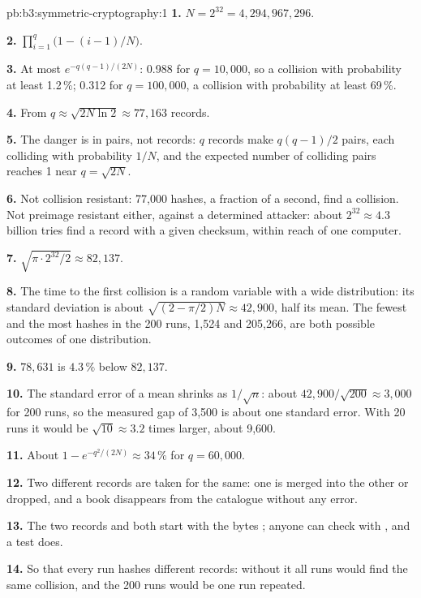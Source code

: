 \begin{solution}{pb:b3:symmetric-cryptography:1}
\textbf{1.} $N = 2^{32} = 4{,}294{,}967{,}296$.

\textbf{2.} $\prod_{i=1}^{q} \bigl(1 - (i - 1)/N\bigr)$.

\textbf{3.} At most $e^{-q(q-1)/(2N)}$: 0.988 for $q = 10{,}000$, so a collision with probability at least 1.2\,\%; 0.312 for $q = 100{,}000$, a collision with probability at least 69\,\%.

\textbf{4.} From $q \approx \sqrt{2N \ln 2} \approx 77{,}163$ records.

\textbf{5.} The danger is in pairs, not records: $q$ records make $q(q - 1)/2$ pairs, each colliding with probability $1/N$, and the expected number of colliding pairs reaches 1 near $q = \sqrt{2N}$.

\textbf{6.} Not collision resistant: 77,000 hashes, a fraction of a second, find a collision. Not preimage resistant either, against a determined attacker: about $2^{32} \approx 4.3$ billion tries find a record with a given checksum, within reach of one computer.

\textbf{7.} $\sqrt{\pi \cdot 2^{32} / 2} \approx 82{,}137$.

\textbf{8.} The time to the first collision is a random variable with a wide distribution: its standard deviation is about $\sqrt{(2 - \pi/2)N} \approx 42{,}900$, half its mean. The fewest and the most hashes in the 200 runs, 1,524 and 205,266, are both possible outcomes of one distribution.

\textbf{9.} $78{,}631$ is $4.3\,\%$ below $82{,}137$.

\textbf{10.} The standard error of a mean shrinks as $1/\sqrt{n}$: about $42{,}900/\sqrt{200} \approx 3{,}000$ for 200 runs, so the measured gap of 3,500 is about one standard error. With 20 runs it would be $\sqrt{10} \approx 3.2$ times larger, about 9,600.

\textbf{11.} About $1 - e^{-q^2/(2N)} \approx 34\,\%$ for $q = 60{,}000$.

\textbf{12.} Two different records are taken for the same: one is merged into the other or dropped, and a book disappears from the catalogue without any error.

\textbf{13.} The two records  and  both start with the bytes ; anyone can check with , and a test does.

\textbf{14.} So that every run hashes different records: without it all runs would find the same collision, and the 200 runs would be one run repeated.


\end{solution}
